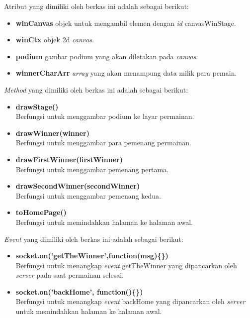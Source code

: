 \begin{enumerate}
\begin{enumerate}
\begin{enumerate}
			Atribut yang dimiliki oleh berkas ini adalah sebagai berikut:
			\begin{itemize}
				\item \textbf{winCanvas} objek untuk mengambil elemen dengan \textit{id} canvasWinStage.
				\item \textbf{winCtx} objek 2d \textit{canvas}.
				\item \textbf{podium} gambar podium yang akan diletakan pada \textit{canvas}.
				\item \textbf{winnerCharArr} \textit{array} yang akan menampung data milik para pemain.
			\end{itemize}
			
			\textit{Method} yang dimiliki oleh berkas ini adalah sebagai berikut:
			\begin{itemize}
				\item \textbf{drawStage()} \\
				Berfungsi untuk menggambar podium ke layar permainan.
				
				\item \textbf{drawWinner(winner)} \\
				Berfungsi untuk menggambar para pemenang permainan.
				
				\item \textbf{drawFirstWinner(firstWinner)} \\
				Berfungsi untuk menggambar pemenang pertama.
				
				\item \textbf{drawSecondWinner(secondWinner)} \\
				Berfungsi untuk menggambar pemenang kedua.
				
				\item \textbf{toHomePage()} \\
				Berfungsi untuk memindahkan halaman ke halaman awal.
			\end{itemize}
			
			\textit{Event} yang dimiliki oleh berkas ini adalah sebagai berikut:
			\begin{itemize}
				\item \textbf{socket.on('getTheWinner',function(msg)\{\})} \\
				Berfungsi untuk menangkap \textit{event} getTheWinner yang dipancarkan oleh \textit{server} pada saat permainan selesai.
				
				\item \textbf{socket.on('backHome', function()\{\})}  \\
				Berfungsi untuk menangkap \textit{event} backHome yang dipancarkan oleh \textit{server} untuk memindahkan halaman ke halaman awal.
				

\end{itemize}
\end{enumerate}
\end{enumerate}
\end{enumerate}
